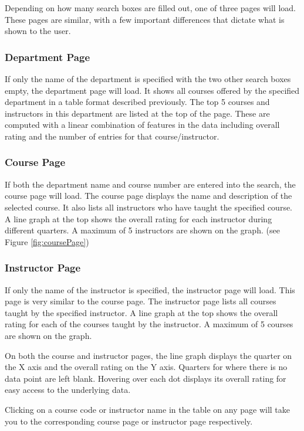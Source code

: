 \documentclass{chi2009}
\begin{document}
Depending on how many search boxes are filled out, one of three pages will load. These pages are similar, with a few important differences that dictate what is shown to the user.


\subsubsection{Department Page}
If only the name of the department is specified with the two other search boxes empty, the department page will load. It shows all courses offered by the specified department in a table format described previously. The top 5 courses and instructors in this department are listed at the top of the page. These are computed with a linear combination of features in the data including overall rating and the number of entries for that course/instructor.

\subsubsection{Course Page}
If both the department name and course number are entered into the search, the course page will load. The course page displays the name and description of the selected course. It also lists all instructors who have taught the specified course. A line graph at the top shows the overall rating for each instructor during different quarters. A maximum of 5 instructors are shown on the graph. (see Figure \ref{fig:coursePage})

\subsubsection{Instructor Page}
If only the name of the instructor is specified, the instructor page will load.  This page is very similar to the course page.  The instructor page lists all courses taught by the specified instructor. A line graph at the top shows the overall rating for each of the courses taught by the instructor. A maximum of 5 courses are shown on the graph.

On both the course and instructor pages, the line graph displays the quarter on the X axis and the overall rating on the Y axis. Quarters for where there is no data point are left blank. Hovering over each dot displays its overall rating for easy access to the underlying data.

Clicking on a course code or instructor name in the table on any page will take you to the corresponding course page or instructor page respectively.
\end{document}
